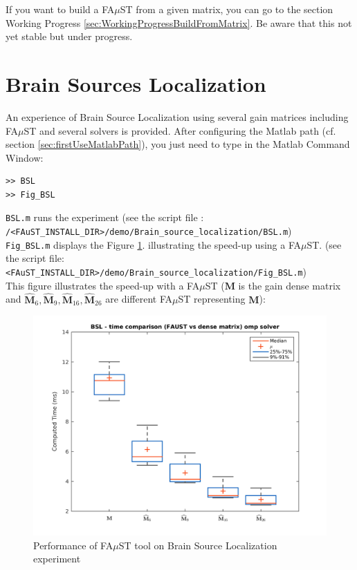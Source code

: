 If you want to build a FA$\mu$ST from a given matrix, you can go to the section Working Progress \ref{sec:WorkingProgressBuildFromMatrix}.
Be aware that this not yet stable but under progress.



\section{Brain Sources Localization}\label{sec:BSL_example}
%
An experience of Brain Source Localization using several gain matrices including FA$\mu$ST and several solvers is provided. After configuring the Matlab path (cf. section \ref{sec:firstUseMatlabPath}), you just need to type in the Matlab Command Window:

\lstset{style=customMatlab}
\begin{lstlisting}
>> BSL
>> Fig_BSL
\end{lstlisting}

\texttt{BSL.m} runs the experiment (see the script file :\\
\texttt{/<FAuST\_INSTALL\_DIR>/demo/Brain\_source\_localization/BSL.m})\\
\texttt{Fig\_BSL.m} displays the Figure \ref{fig:BSL}. illustrating the speed-up using a FA$\mu$ST. (see the script file:\\
\texttt{<FAuST\_INSTALL\_DIR>/demo/Brain\_source\_localization/Fig\_BSL.m}) \\

This figure illustrates the speed-up with a FA$\mu$ST ($\mathbf{M}$ is the gain dense matrix and $\widehat{\mathbf{M}}_{6},\widehat{\mathbf{M}}_{9},\widehat{\mathbf{M}}_{16},\widehat{\mathbf{M}}_{26}$ are different FA$\mu$ST representing  $\mathbf{M}$):


\begin{figure}[H] %
\centering
\includegraphics[scale=0.7]{images/BSL.png}
\caption{Performance of FA$\mu$ST tool on Brain Source Localization experiment}
\label{fig:BSL}
\end{figure}






 
